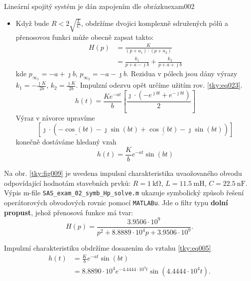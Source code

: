 \begin{tkyexam}{Lineární spojitý systém je dán zapojením dle obrázku}{exam002}
\begin{itemize}[leftmargin=12pt,noitemsep]
\begin{align*}
          \end{align*}
    \item Když bude $R<2\sqrt{\frac{L}{C}}$, obdržíme dvojici komplexně sdružených pólů a
          přenosovou funkci může obecně zapsat takto:
          \begin{align*}
            H(p)&=\frac{K}{(p+a_1)\cdot(p+a_2)}            \\
                &=\frac{k_1}{p+a-\jmath b}+\frac{k_2}{p+a+\jmath b}
          \end{align*}
          kde $p_{\infty_1}=-a+\jmath b$, $p_{\infty_2}=-a-\jmath b$. Rezidua v pólech jsou dány
          výrazy $k_1=-\frac{\jmath K}{2b}$, $k_2=\frac{\jmath K}{2b}$. Impulzní odezvu opět
          určíme užitím rov. \ref{tky:eq023}.
          \begin{equation*}
            h(t) = \frac{Ke^{-at}}{b}
                    \left[\dfrac{\jmath\cdot\left(-e^{\jmath bt}+e^{-\jmath bt}\right)}{2}\right]
          \end{equation*}
          Výraz v závorce upravíme
          \begin{equation*}
            \left[\jmath\cdot\left(\underline{-\cos(bt)}-\jmath\sin(bt) + 
                                    \underline{\cos(bt)} -\jmath\sin(bt)
                              \right)
            \right]                                                     
          \end{equation*}
          konečně dostáváme hledaný vzah
          \begin{equation*}              
            h(t) = \frac{K}{b}e^{-at}\sin(bt)                                   
          \end{equation*}
  \end{itemize}
  
  Na obr. \ref{tky:fig009} je uvedena impulsní charakteristika uvaožovaného obvodu odpovídající
  hodnotám stavebních prvků: \(R=\qty{1}{\kohm}\), \(L=\qty{11.5}{\milli\henry}\),
  \(C=\qty{22.5}{\nano\farad}\). Výpis m-file \texttt{SAS\_exam\_02\_symb\_Hp\_solve.m} ukazuje
  symbolický způsob řešení operátorových obvodových rovnic pomocí \texttt{MATLABu}. Jde o filtr typu
  \textbf{dolní propust}, jehož přenosová funkce má tvar:
  $$H(p)= \frac{3.9506\cdot10^9}{p^2+8.8889\cdot10^4p+3.9506\cdot10^9}.$$

  Impulzní charakteristiku obdržíme dosazením do vztahu \ref{tky:eq005}
  \begin{align*}
    h(t)&=\frac{K}{b}e^{-at}\sin(bt)                                      \\
        &=8.8890\cdot10^4e^{-4.4444\cdot10^4t}\sin(4.4444\cdot10^4t).
  \end{align*}
      

\end{tkyexam}

